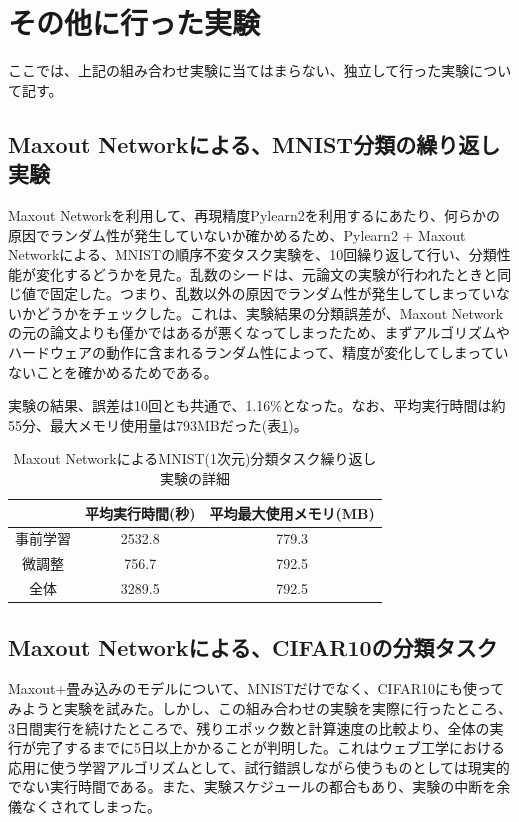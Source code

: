 \section{その他に行った実験}
ここでは、上記の組み合わせ実験に当てはまらない、独立して行った実験について記す。

\subsection{Maxout Networkによる、MNIST分類の繰り返し実験}
Maxout Networkを利用して、再現精度Pylearn2を利用するにあたり、何らかの原因でランダム性が発生していないか確かめるため、Pylearn2 + Maxout Networkによる、MNISTの順序不変タスク実験を、10回繰り返して行い、分類性能が変化するどうかを見た。乱数のシードは、元論文の実験が行われたときと同じ値で固定した。つまり、乱数以外の原因でランダム性が発生してしまっていないかどうかをチェックした。これは、実験結果の分類誤差が、Maxout Networkの元の論文よりも僅かではあるが悪くなってしまったため、まずアルゴリズムやハードウェアの動作に含まれるランダム性によって、精度が変化してしまっていないことを確かめるためである。\par
実験の結果、誤差は10回とも共通で、1.16\%となった。なお、平均実行時間は約55分、最大メモリ使用量は793MBだった(表\ref{c5_maxout_mnist1_stat})。\par

\begin{table}[tdp]
\caption{Maxout NetworkによるMNIST(1次元)分類タスク繰り返し実験の詳細}
\begin{center}
\begin{tabular}{|c|c|c|}\hline
 & 平均実行時間(秒) & 平均最大使用メモリ(MB) \\ \hline
事前学習 & 2532.8 & 779.3 \\ \hline
微調整 & 756.7 & 792.5 \\ \hline
全体 & 3289.5 & 792.5 \\ \hline
\end{tabular}
\end{center}
\label{c5_maxout_mnist1_stat}
\end{table}%


\subsection{Maxout Networkによる、CIFAR10の分類タスク}
Maxout+畳み込みのモデルについて、MNISTだけでなく、CIFAR10にも使ってみようと実験を試みた。しかし、この組み合わせの実験を実際に行ったところ、3日間実行を続けたところで、残りエポック数と計算速度の比較より、全体の実行が完了するまでに5日以上かかることが判明した。これはウェブ工学における応用に使う学習アルゴリズムとして、試行錯誤しながら使うものとしては現実的でない実行時間である。また、実験スケジュールの都合もあり、実験の中断を余儀なくされてしまった。%